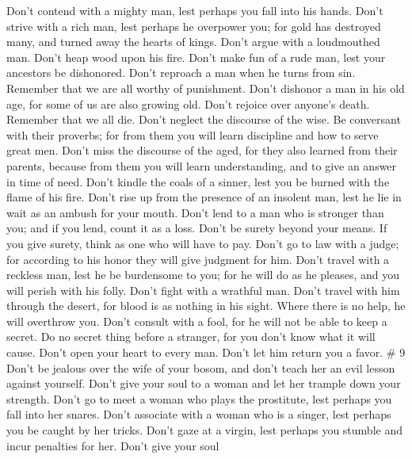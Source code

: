  Don't contend with a mighty man, lest perhaps you fall
into his hands.  Don't strive with a rich man, lest
perhaps he overpower you; for gold has destroyed many, and turned away
the hearts of kings.  Don't argue with a loudmouthed man.
Don't heap wood upon his fire.  Don't make fun of a rude
man, lest your ancestors be dishonored.  Don't reproach a
man when he turns from sin. Remember that we are all worthy of
punishment.  Don't dishonor a man in his old age, for some
of us are also growing old.  Don't rejoice over anyone's
death. Remember that we all die.  Don't neglect the
discourse of the wise. Be conversant with their proverbs; for from them
you will learn discipline and how to serve great men. 
Don't miss the discourse of the aged, for they also learned from their
parents, because from them you will learn understanding, and to give an
answer in time of need.  Don't kindle the coals of a
sinner, lest you be burned with the flame of his fire. 
Don't rise up from the presence of an insolent man, lest he lie in wait
as an ambush for your mouth.  Don't lend to a man who is
stronger than you; and if you lend, count it as a loss. 
Don't be surety beyond your means. If you give surety, think as one who
will have to pay.  Don't go to law with a judge; for
according to his honor they will give judgment for him. 
Don't travel with a reckless man, lest he be burdensome to you; for he
will do as he pleases, and you will perish with his folly.
 Don't fight with a wrathful man. Don't travel with him
through the desert, for blood is as nothing in his sight. Where there is
no help, he will overthrow you.  Don't consult with a
fool, for he will not be able to keep a secret.  Do no
secret thing before a stranger, for you don't know what it will cause.
 Don't open your heart to every man. Don't let him return
you a favor. \# 9  Don't be jealous over the wife of your
bosom, and don't teach her an evil lesson against yourself.
 Don't give your soul to a woman and let her trample down
your strength.  Don't go to meet a woman who plays the
prostitute, lest perhaps you fall into her snares.  Don't
associate with a woman who is a singer, lest perhaps you be caught by
her tricks.  Don't gaze at a virgin, lest perhaps you
stumble and incur penalties for her.  Don't give your soul
